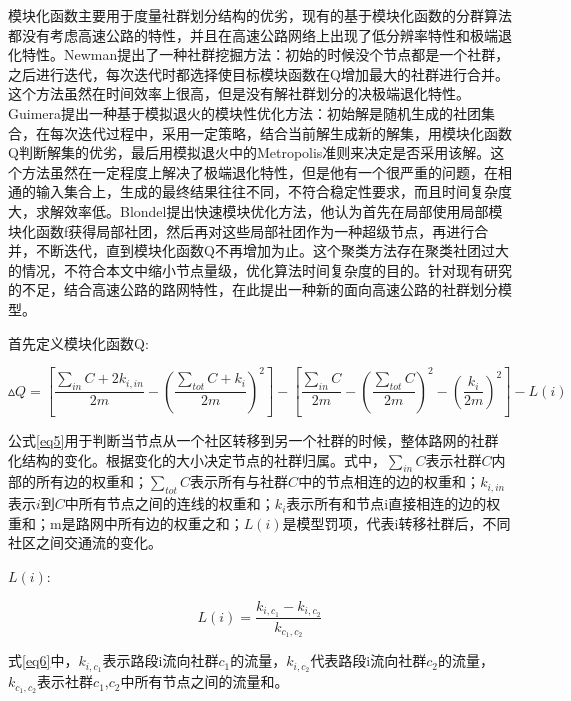 				模块化函数主要用于度量社群划分结构的优劣，现有的基于模块化函数的分群算法都没有考虑高速公路的特性\parencite{WeightPretreatment}，并且在高速公路网络上出现了低分辨率特性和极端退化特性\parencite{Ren2014The}。Newman提出了一种社群挖掘方法\parencite{NewmanFast}：初始的时候没个节点都是一个社群，之后进行迭代，每次迭代时都选择使目标模块函数在Q增加最大的社群进行合并。这个方法虽然在时间效率上很高，但是没有解社群划分的决极端退化特性。Guimera提出一种基于模拟退火的模块性优化方法：初始解是随机生成的社团集合，在每次迭代过程中，采用一定策略，结合当前解生成新的解集，用模块化函数Q判断解集的优劣，最后用模拟退火中的Metropolis准则来决定是否采用该解。这个方法虽然在一定程度上解决了极端退化特性，但是他有一个很严重的问题，在相通的输入集合上，生成的最终结果往往不同，不符合稳定性要求，而且时间复杂度大，求解效率低。Blondel\parencite{TuihuoEfficency}提出快速模块优化方法，他认为首先在局部使用局部模块化函数f获得局部社团，然后再对这些局部社团作为一种超级节点，再进行合并，不断迭代，直到模块化函数Q不再增加为止。这个聚类方法存在聚类社团过大的情况，不符合本文中缩小节点量级，优化算法时间复杂度的目的。针对现有研究的不足，结合高速公路的路网特性，在此提出一种新的面向高速公路的社群划分模型。

				首先定义模块化函数Q:

				\begin{equation}
				\vartriangle Q = [\frac{{\sum_{in} C  + 2{k_{i,in}}}}{{2m}} - {(\frac{{\sum_{tot} C  + {k_i}}}{{2m}})^2}] - [\frac{{\sum_{in} C }}{{2m}} - {(\frac{{\sum_{tot} C }}{{2m}})^2} - {(\frac{{{k_i}}}{{2m}})^2}] - L(i)
				\label{eq5}
				\end{equation}

				公式\ref{eq5}用于判断当节点从一个社区转移到另一个社群的时候，整体路网的社群化结构的变化。根据变化的大小决定节点的社群归属。式中，$\sum_{in} C$表示社群$C$内部的所有边的权重和；$\sum_{tot} C$表示所有与社群$C$中的节点相连的边的权重和；$k_{i,in}$表示$i$到$C$中所有节点之间的连线的权重和；$k_i$表示所有和节点i直接相连的边的权重和；m是路网中所有边的权重之和；$L(i)$是模型罚项，代表i转移社群后，不同社区之间交通流的变化。

				$L(i)$:

				\begin{equation}
				L(i)=\frac{{{k_{i,{c_1}}} - {k_{i,{c_2}}}}}{{{k_{{c_1},{c_2}}}}}
				\label{eq6}
				\end{equation}

				式\ref{eq6}中，${k_{i,{c_1}}}$表示路段i流向社群$c_1$的流量，$k_{i,{c_2}}$代表路段i流向社群$c_2$的流量，${{{k_{{c_1},{c_2}}}}}$表示社群$c_1$,$c_2$中所有节点之间的流量和。

